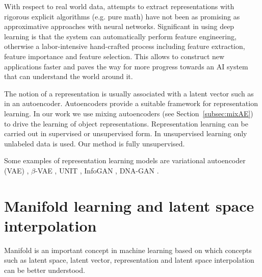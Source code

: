 \documentclass[a4paper,12pt]{report}
\begin{document}
With respect to real world data, attempts to extract representations with rigorous explicit algorithms (e.g. pure math) have not been as promising as approximative approaches with neural networks. Significant in using deep learning is that the system can automatically perform feature engineering, otherwise a labor-intensive hand-crafted process including feature extraction, feature importance and feature selection. This allows to construct new applications faster and paves the way for more progress towards an AI system that can understand the world around it.

The notion of a representation is usually associated with a latent vector such as in an autoencoder. Autoencoders provide a suitable framework for representation learning. In our work we use mixing autoencoders (see Section~\ref{subsec:mixAE}) to drive the learning of object representations. Representation learning can be carried out in supervised or unsupervised form. In unsupervised learning only unlabeled data is used. Our method is fully unsupervised.

Some examples of representation learning models are variational autoencoder (VAE) \cite{VAE}, $\beta$-VAE \cite{betaVAE}, UNIT \cite{UNIT}, InfoGAN \cite{InfoGAN}, DNA-GAN \cite{DnaGan}.



\section{Manifold learning and latent space interpolation}
Manifold is an important concept in machine learning based on which concepts such as latent space, latent vector, representation and latent space interpolation can be better understood. 
\end{document}
